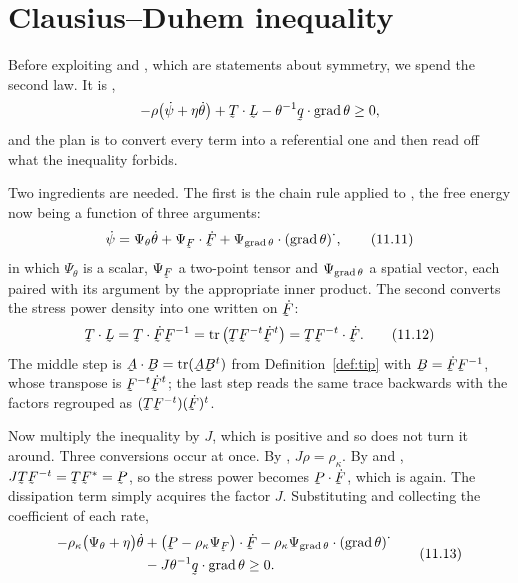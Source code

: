 \section{Clausius--Duhem inequality}\label{sec:ch11cd}

Before exploiting  and , which are statements about
symmetry, we spend the second law. It is ,
\[
   -\rho\big(\dot\psi+\eta\dot\theta\big)+\bT\cdot\bL
   -\theta^{-1}\ip\bq{\grad\theta}\geq0 ,
\]
and the plan is to convert every term into a referential one and then
read off what the inequality forbids.

Two ingredients are needed. The first is the chain rule applied to
, the free energy now being a function of three arguments:
\begin{equation}
   \dot\psi=\Psi_{\theta}\dot\theta+\Psi_{\bF}\cdot\dot\bF
   +\Psi_{\grad\theta}\cdot(\grad\theta)^{\textstyle\cdot} ,
   \tag{11.11}\label{eq:11.11}
\end{equation}
in which $\Psi_{\theta}$ is a scalar, $\Psi_{\bF}$ a two-point tensor
and $\Psi_{\operatorname{grad}\theta}$ a spatial vector, each paired with its argument
by the appropriate inner product. The second converts the stress power
density into one written on $\dot\bF$:
\begin{equation}
   \bT\cdot\bL=\bT\cdot\dot\bF\bF^{-1}
   =\tr\big(\bT\bF^{-t}\dot\bF^{t}\big)=\bT\bF^{-t}\cdot\dot\bF .
   \tag{11.12}\label{eq:11.12}
\end{equation}
The middle step is $\bA\cdot\bB=\tr(\bA\bB^{t})$ from
Definition~\ref{def:tip} with $\bB=\dot\bF\bF^{-1}$, whose transpose is
$\bF^{-t}\dot\bF^{t}$; the last step reads the same trace backwards with
the factors regrouped as $(\bT\bF^{-t})(\dot\bF)^{t}$.

Now multiply the inequality by $J$, which is positive and so does not
turn it around. Three conversions occur at once. By ,
$J\rho=\rho_{\kappa}$. By  and ,
$J\bT\bF^{-t}=\bT\bF^{*}=\bP$, so the stress power becomes
$\bP\cdot\dot\bF$, which is  again. The dissipation term
simply acquires the factor $J$. Substituting  and collecting
the coefficient of each rate,
\begin{equation}
\begin{aligned}
   -\rho_{\kappa}\big(\Psi_{\theta}+\eta\big)\dot\theta
   &+\big(\bP-\rho_{\kappa}\Psi_{\bF}\big)\cdot\dot\bF
   -\rho_{\kappa}\Psi_{\grad\theta}\cdot(\grad\theta)^{\textstyle\cdot}\\
   &-J\theta^{-1}\ip\bq{\grad\theta}\geq0 .
\end{aligned}
   \tag{11.13}\label{eq:11.13}
\end{equation}

